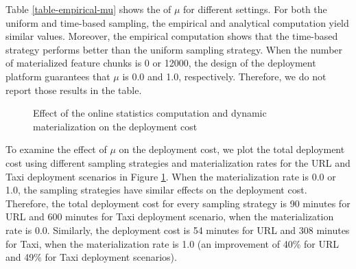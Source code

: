 Table \ref{table-empirical-mu} shows the  of $\mu$ for different settings.
For both the uniform and time-based sampling, the empirical and analytical computation yield similar values.
Moreover, the empirical computation shows that the time-based strategy performs better than the uniform sampling strategy.
When the number of materialized feature chunks is 0 or 12000, the design of the deployment platform guarantees that $\mu$ is 0.0 and 1.0, respectively. 
Therefore, we do not report those results in the table.
\begin{figure}[!h]
\centering
\resizebox{\columnwidth}{!}{}
 \vspace{-15pt}
\caption{Effect of the online statistics computation and dynamic materialization on the deployment cost}
 \vspace{-10pt}
\label{fig-optimization-effect}
\end{figure}

To examine the effect of $\mu$ on the deployment cost, we plot the total deployment cost using different sampling strategies and materialization rates for the URL and Taxi deployment scenarios in Figure \ref{fig-optimization-effect}.
When the materialization rate is 0.0 or 1.0, the sampling strategies have similar effects on the deployment cost. 
Therefore, the total deployment cost for every sampling strategy is 90 minutes for URL and 600 minutes for Taxi deployment scenario, when the materialization rate is 0.0.
Similarly, the deployment cost is 54 minutes for URL and 308 minutes for Taxi, when the materialization rate is 1.0 (an improvement of 40\% for URL and 49\% for Taxi deployment scenarios).

